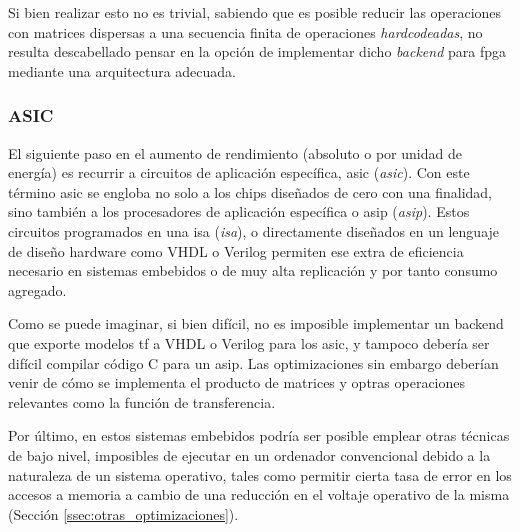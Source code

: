 Si bien realizar esto no es trivial, sabiendo que es posible reducir las operaciones con matrices dispersas a una secuencia finita de operaciones \textit{hardcodeadas}, no resulta descabellado pensar en la opción de implementar dicho \textit{backend} para \acrshort{fpga} mediante una arquitectura adecuada.

\subsubsection{ASIC}
\label{sssec:heterogeneas_asic}
El siguiente paso en el aumento de rendimiento (absoluto o por unidad de energía) es recurrir a circuitos de aplicación específica, \acrshort{asic} (\textit{\acrlong{asic}}). Con este término \acrshort{asic} se engloba no solo a los chips diseñados de cero con una finalidad, sino también a los procesadores de aplicación específica o \acrshort{asip} (\textit{\acrlong{asip}}). Estos circuitos programados en una \acrshort{isa} (\textit{\acrlong{isa}}), o directamente diseñados en un lenguaje de diseño hardware como VHDL o Verilog permiten ese extra de eficiencia necesario en sistemas embebidos o de muy alta replicación y por tanto consumo agregado.

Como se puede imaginar, si bien difícil, no es imposible implementar un backend que exporte modelos \acrlong{tf} a VHDL o Verilog para los \acrshort{asic}, y tampoco debería ser difícil compilar código C para un \acrshort{asip}. Las optimizaciones sin embargo deberían venir de cómo se implementa el producto de matrices y optras operaciones relevantes como la función de transferencia.

Por último, en estos sistemas embebidos podría ser posible emplear otras técnicas de bajo nivel, imposibles de ejecutar en un ordenador convencional debido a la naturaleza de un sistema operativo, tales como permitir cierta tasa de error en los accesos a memoria a cambio de una reducción en el voltaje operativo de la misma (Sección \ref{ssec:otras_optimizaciones}).